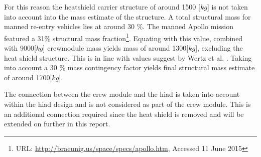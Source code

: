 For this reason the heatshield carrier structure of around 1500 [$kg$] \cite{Ainsworth2014} is not taken into account into the mass estimate of the structure. A total structural mass for manned re-entry vehicles lies at around 30 \%. The manned Apollo mission featured a 31\% structural mass fraction\footnote{URL: \url{http://braeunig.us/space/specs/apollo.htm}, Accessed 11 June 2015}. Equating with this value, combined with 9000[$kg$] crewmodule mass yields mass of around 1300[$kg$], excluding the heat shield structure. This is in line with values suggest by Wertz et al. \cite{Wertz2011}. Taking into account a 30 \% mass contingency factor yields final structural mass estimate of around 1700[$kg$].

The connection between the crew module and the \gls{hiad} is taken into account within the \gls{hiad} design and is not considered as part of the crew module. This is an additional connection required since the heat shield is removed and will be extended on further in this report.



